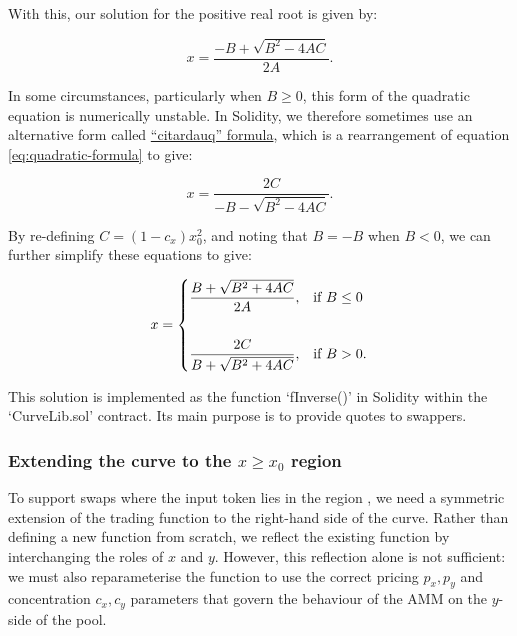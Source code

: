 \documentclass{article}
\begin{document}
With this, our solution for the positive real root is given by:

\begin{equation}
\label{eq:quadratic-formula}
    x
    =
    \frac{-B + \sqrt{B^2 - 4AC}}{2A}.
\end{equation}

In some circumstances, particularly when $B \geq 0$, this form of the quadratic equation is numerically unstable. In Solidity, we therefore sometimes use an alternative form called \href{https://en.wikipedia.org/wiki/Quadratic_formula}{``citardauq'' formula}, which is a rearrangement of equation \eqref{eq:quadratic-formula} to give:

\begin{equation}
\label{eq:citardauq-formula}
    x
    =
    \frac{2C}{-B - \sqrt{B^2 - 4AC}}.
\end{equation}

By re-defining $C = \left(1 - c_{x} \right) x_{0}^{2}$, and noting that $B = -B$ when $B < 0$, we can further simplify these equations to give:

\begin{align}
    \label{eq:Eulerswap-inverse}
    x =
    \begin{dcases}
    \frac{B + \sqrt{B^2 + 4AC}}{2A}, & \text{if } B \leq 0 \\\\
    \frac{2C}{B + \sqrt{B^2 + 4AC}}, & \text{if } B > 0.
    \end{dcases}
\end{align}

This solution is implemented as the function `fInverse()' in Solidity within the `CurveLib.sol' contract. Its main purpose is to provide quotes to swappers. 

\subsubsection{Extending the curve to the $x \geq x_0$ region}

To support swaps where the input token lies in the region , we need a symmetric extension of the trading function to the right-hand side of the curve. Rather than defining a new function from scratch, we reflect the existing function by interchanging the roles of $x$ and $y$. However, this reflection alone is not sufficient: we must also reparameterise the function to use the correct pricing $p_x, p_y$ and concentration $c_x, c_y$ parameters that govern the behaviour of the AMM on the $y$-side of the pool.
\end{document}
